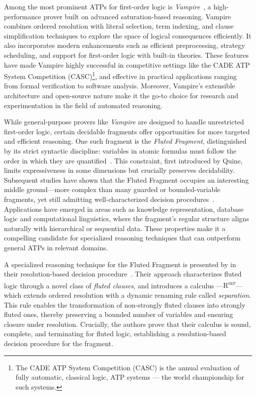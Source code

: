 Among the most prominent ATPs for first-order logic is \textit{Vampire}~\cite{kovacs2013vampire}, a high-performance prover built on advanced saturation-based reasoning.
Vampire combines ordered resolution with literal selection, term indexing, and clause simplification techniques to explore the space of logical consequences efficiently.
It also incorporates modern enhancements such as efficient preprocessing, strategy scheduling, and support for first-order logic with built-in theories.
These features have made Vampire highly successful in competitive settings like the CADE ATP System Competition (CASC)\footnote{The CADE ATP System Competition (CASC) is the annual evaluation of fully automatic, classical logic, ATP systems --- the world championship for such systems.}, and effective in practical applications ranging from formal verification to software analysis.
Moreover, Vampire's extensible architecture and open-source nature make it the go-to choice for research and experimentation in the field of automated reasoning.

While general-purpose provers like \textit{Vampire} are designed to handle unrestricted first-order logic, certain decidable fragments offer opportunities for more targeted and efficient reasoning.
One such fragment is the \emph{Fluted Fragment}, distinguished by its strict syntactic discipline: variables in atomic formulas must follow the order in which they are quantified~\cite{quine1968predicate}.
This constraint, first introduced by Quine, limits expressiveness in some dimensions but crucially preserves decidability. Subsequent studies have shown that the Fluted Fragment occupies an interesting middle ground—more complex than many guarded or bounded-variable fragments, yet still admitting well-characterized decision procedures~\cite{pratt2019fluted}.
Applications have emerged in areas such as knowledge representation, database logic and computational linguistics, where the fragment’s regular structure aligns naturally with hierarchical or sequential data.
These properties make it a compelling candidate for specialized reasoning techniques that can outperform general ATPs in relevant domains.

A specialized reasoning technique for the Fluted Fragment is presented by \citeauthor{schmidt2000resolution} in their resolution-based decision procedure~\cite{schmidt2000resolution}.
Their approach characterizes fluted logic through a novel class of \emph{fluted clauses}, and introduces a calculus ---\textsc{R\textsuperscript{sep}}--- which extends ordered resolution with a dynamic renaming rule called \emph{separation}.
This rule enables the transformation of non-strongly fluted clauses into strongly fluted ones, thereby preserving a bounded number of variables and ensuring closure under resolution.
Crucially, the authors prove that their calculus is sound, complete, and terminating for fluted logic, establishing a resolution-based decision procedure for the fragment.

